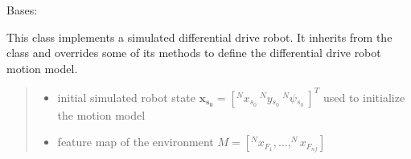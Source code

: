 \documentclass[letterpaper,10pt,english]{sphinxmanual}
\begin{document}
\begin{fulllineitems}
\label{\detokenize{robot_simulation:DifferentialDriveSimulatedRobot.DifferentialDriveSimulatedRobot}}
\pysigstartsignatures
{}
\pysigstopsignatures
\sphinxAtStartPar
Bases: {\hyperref[\detokenize{robot_simulation:SimulatedRobot.SimulatedRobot}]{}}

\sphinxAtStartPar
This class implements a simulated differential drive robot. It inherits from the  class and
overrides some of its methods to define the differential drive robot motion model.

\begin{fulllineitems}
\label{\detokenize{robot_simulation:DifferentialDriveSimulatedRobot.DifferentialDriveSimulatedRobot.__init__}}
\pysigstartsignatures
{}
\pysigstopsignatures\begin{quote}\begin{description}
\begin{itemize}
\item {} 
\sphinxAtStartPar
{} \textendash{} initial simulated robot state \(\mathbf{x_{s_0}}=[^Nx{_{s_0}}~^Ny{_{s_0}}~^N\psi{_{s_0}}~]^T\) used to initialize the  motion model

\item {} 
\sphinxAtStartPar
{} \textendash{} feature map of the environment \(M=[^Nx_{F_1},...,^Nx_{F_{nf}}]\)

\end{itemize}

\end{description}\end{quote}


\end{fulllineitems}
\end{fulllineitems}
\end{document}
